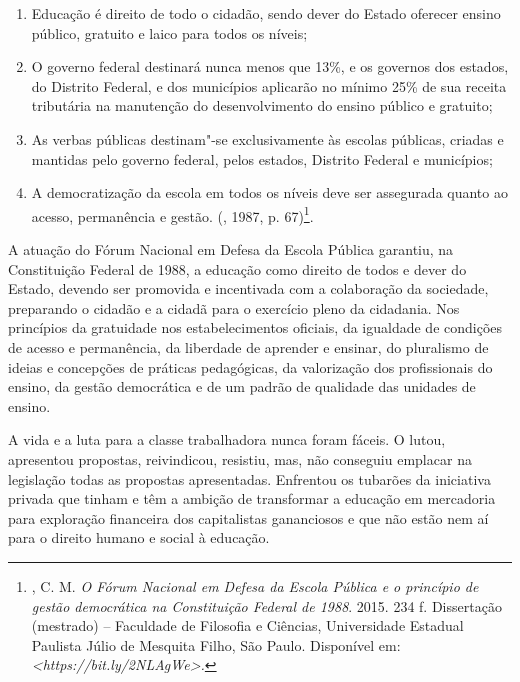 \begin{enumerate}
\item{}Educação é direito de todo o cidadão, sendo dever do Estado
oferecer ensino público, gratuito e laico para todos os níveis;

\item{}O governo federal destinará nunca menos que 13\%, e os governos
dos estados, do Distrito Federal, e dos municípios aplicarão no mínimo
25\% de sua receita tributária na manutenção do desenvolvimento do
ensino público e gratuito;

\item{}As verbas públicas destinam"-se exclusivamente às escolas
públicas, criadas e mantidas pelo governo federal, pelos estados,
Distrito Federal e municípios;

\item{}A democratização da escola em todos os níveis deve ser
assegurada quanto ao acesso, permanência e gestão. (, 1987, p.
67)\footnote{, C. M. \emph{O Fórum Nacional em
  Defesa da Escola Pública e o princípio de gestão democrática na
  Constituição Federal de 1988}. 2015. 234 f. Dissertação (mestrado) --
  Faculdade de Filosofia e Ciências, Universidade Estadual Paulista
  Júlio de Mesquita Filho, São Paulo. Disponível em:
  \emph{\textless{}https://bit.ly/2NLAgWe\textgreater{}.}}.
\end{enumerate}

A atuação do Fórum Nacional em Defesa da Escola Pública garantiu, na
Constituição Federal de 1988, a educação como direito de todos e dever
do Estado, devendo ser promovida e incentivada com a colaboração da
sociedade, preparando o cidadão e a cidadã para o exercício pleno da
cidadania. Nos princípios da gratuidade nos estabelecimentos oficiais,
da igualdade de condições de acesso e permanência, da liberdade de
aprender e ensinar, do pluralismo de ideias e concepções de práticas
pedagógicas, da valorização dos profissionais do ensino, da gestão
democrática e de um padrão de qualidade das unidades de ensino.

A vida e a luta para a classe trabalhadora nunca foram fáceis. O 
lutou, apresentou propostas, reivindicou, resistiu, mas, não conseguiu
emplacar na legislação todas as propostas apresentadas. Enfrentou os
tubarões da iniciativa privada que tinham e têm a ambição de transformar
a educação em mercadoria para exploração financeira dos capitalistas
gananciosos e que não estão nem aí para o direito humano e social à
educação.

